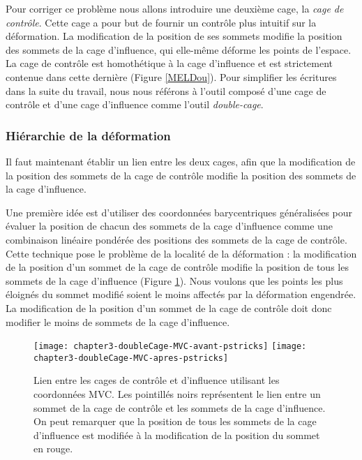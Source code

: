 Pour corriger ce problème nous allons introduire une deuxième cage, la
\textit{cage de contrôle}. Cette cage a pour but de fournir un contrôle plus
intuitif sur la déformation. La modification de la position de ses sommets
modifie la position des sommets de la cage d'influence, qui elle-même déforme
les points de l'espace. La cage de contrôle est homothétique à la cage
d'influence et est strictement contenue dans cette dernière (Figure
\ref{MELDou}). Pour simplifier les écritures dans la suite du travail, nous
nous référons à l'outil composé d'une cage de contrôle et d'une cage
d'influence comme l'outil \textit{double-cage}.

\subsubsection{Hiérarchie de la déformation}

Il faut maintenant établir un lien entre les deux cages, afin que la
modification de la position des sommets de la cage de contrôle modifie la
position des sommets de la cage d'influence.

Une première idée est d'utiliser des coordonnées barycentriques généralisées
pour évaluer la position de chacun des sommets de la cage d'influence comme
une combinaison linéaire pondérée des positions des sommets de la cage de
contrôle. Cette technique pose le problème de la localité de la déformation :
la modification de la position d'un sommet de la cage de contrôle modifie la
position de tous les sommets de la cage d'influence (Figure \ref{MELDMV}).
Nous voulons que les points les plus éloignés du sommet modifié soient le
moins affectés par la déformation engendrée. La modification de la position
d'un sommet de la cage de contrôle doit donc modifier le moins de sommets de
la cage d'influence.

\begin{figure}[!ht]
  \texttt{[image: chapter3-doubleCage-MVC-avant-pstricks]}
  \texttt{[image: chapter3-doubleCage-MVC-apres-pstricks]}

  \caption[Lien double-cage MVC] {Lien entre les cages de contrôle et
d'influence utilisant les coordonnées MVC. Les pointillés noirs représentent
le lien entre un sommet de la cage de contrôle et les sommets de la cage
d'influence. On peut remarquer que la position de tous les sommets de la cage
d'influence est modifiée à la modification de la position du sommet en rouge.}

  \label{MELDMV}
\end{figure}

